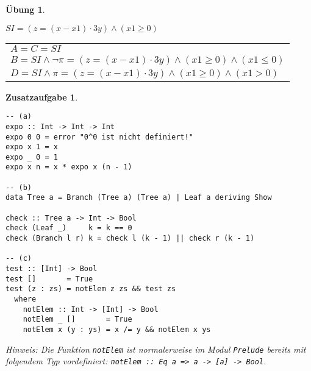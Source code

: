 \documentclass[11pt, twoside, BCOR=16mm, a4paper, DIV=15, numbers=noenddot]{scrartcl}
\theoremstyle{break}
\newtheorem{ex}{Übung}
\newtheorem{zu}{Zusatzaufgabe}
\begin{document}
\begin{ex}
  \begin{teilaufg}
\item $SI = (z=(x-x1)\cdot 3y)\wedge(x1\geq0)$
%
\item 
\begin{tabular}[t]{@{}l}
$A=C=SI$\\
$B=SI\wedge\neg\pi=(z=(x-x1)\cdot 3y)\wedge(x1\geq0)\wedge(x1\leq0)$\\
$D=SI\wedge\pi=(z=(x-x1)\cdot 3y)\wedge(x1\geq0)\wedge(x1>0)$
\end{tabular}
\end{teilaufg}
\end{ex}


\begin{zu}
  ~
  \begin{lstlisting}[language=Haskell2010]
-- (a)
expo :: Int -> Int -> Int
expo 0 0 = error "0^0 ist nicht definiert!"
expo x 1 = x
expo _ 0 = 1
expo x n = x * expo x (n - 1)

-- (b)
data Tree a = Branch (Tree a) (Tree a) | Leaf a deriving Show

check :: Tree a -> Int -> Bool
check (Leaf _)     k = k == 0
check (Branch l r) k = check l (k - 1) || check r (k - 1)

-- (c)
test :: [Int] -> Bool
test []       = True
test (z : zs) = notElem z zs && test zs
  where
    notElem :: Int -> [Int] -> Bool
    notElem _ []       = True
    notElem x (y : ys) = x /= y && notElem x ys
\end{lstlisting}
\emph{Hinweis:} Die Funktion \lstinline!notElem! ist normalerweise im Modul \lstinline!Prelude! bereits mit folgendem Typ vordefiniert: \lstinline!notElem :: Eq a => a -> [a] -> Bool!.

\end{zu}

\newcommand{\uniftuple}[2]{\begin{pmatrix}#1\\ #2\end{pmatrix}}
\newcommand*{\unifArr}[1]{\stackrel{\smash{\text{#1}}}{\Longrightarrow}}
\newcommand*{\unifArrD}{\unifArr{Dek.}}%
\newcommand*{\unifArrE}{\unifArr{El.}}%
\newcommand*{\unifArrP}{\unifArr{Vert.}}%
\newcommand*{\unifArrS}{\unifArr{Sub.}}%
\end{document}
